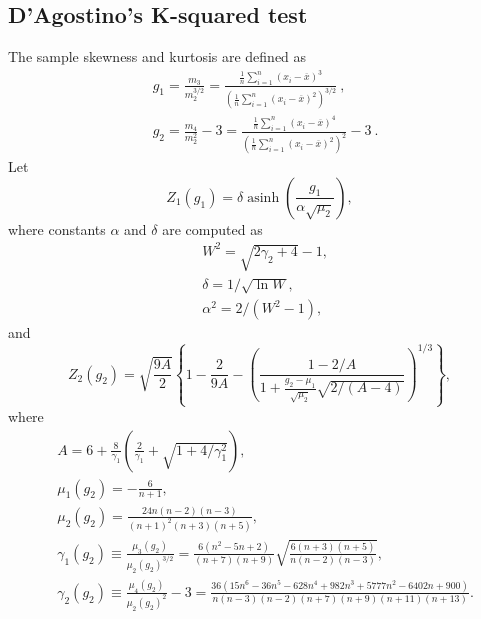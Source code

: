         \subsection{D'Agostino's K-squared test}
            The sample skewness and kurtosis are defined as
            \begin{align}
                & g_1 = \frac{ m_3 }{ m_2^{3/2} } = \frac{\frac{1}{n} \sum_{i=1}^n \left( x_i - \overline{x} \right)^3}{\left( \frac{1}{n} \sum_{i=1}^n \left( x_i - \overline{x} \right)^2 \right)^{3/2}}\ , \\
                & g_2 = \frac{ m_4 }{ m_2^{2} }-3 = \frac{\frac{1}{n} \sum_{i=1}^n \left( x_i - \overline{x} \right)^4}{\left( \frac{1}{n} \sum_{i=1}^n \left( x_i - \overline{x} \right)^2 \right)^2} - 3\ .
            \end{align}
            Let
            \begin{equation}
                Z_1(g_1) = \delta \operatorname{asinh}\left( \frac{g_1}{\alpha\sqrt{\mu_2}} \right),
            \end{equation}
            where constants $\alpha$ and $\delta$ are computed as
            \begin{align}
                & W^2 = \sqrt{2\gamma_2 + 4} - 1, \\
                & \delta = 1 / \sqrt{\ln W}, \\
                & \alpha^2 = 2 / (W^2-1),
            \end{align}
            and
            \begin{equation}
                Z_2(g_2) = \sqrt{\frac{9A}{2}} \left\{1 - \frac{2}{9A} - \left(\frac{ 1-2/A }{ 1+\frac{g_2-\mu_1}{\sqrt{\mu_2}}\sqrt{2/(A-4)} }\right)^{\!1/3}\right\},  
            \end{equation}
            where
            \begin{align}
                & A = 6 + \frac{8}{\gamma_1} \left( \frac{2}{\gamma_1} + \sqrt{1+4/\gamma_1^2}\right), \\
                & \mu_1(g_2) = - \frac{6}{n+1}, \\
                & \mu_2(g_2) = \frac{ 24n(n-2)(n-3) }{ (n+1)^2(n+3)(n+5) }, \\
                & \gamma_1(g_2) \equiv \frac{\mu_3(g_2)}{\mu_2(g_2)^{3/2}} = \frac{6(n^2-5n+2)}{(n+7)(n+9)} \sqrt{\frac{6(n+3)(n+5)}{n(n-2)(n-3)}},  \label{eq:gamma1}\\
                & \gamma_2(g_2) \equiv \frac{\mu_4(g_2)}{\mu_2(g_2)^{2}}-3 = \frac{ 36(15n^6-36n^5-628n^4+982n^3+5777n^2-6402n+900) }{ n(n-3)(n-2)(n+7)(n+9)(n+11)(n+13) }\label{eq:gamma2}.
            \end{align}

